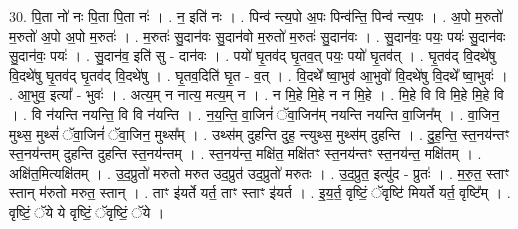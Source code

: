 \documentclass[17pt]{extarticle}
\begin{document}
30. पि॒ता नो॑ नः पि॒ता पि॒ता नः॑ । . न॒ इति॑ नः । . पिन्व॑ न्त्य॒पो अ॒पः पिन्व॑न्ति॒ पिन्व॑ न्त्य॒पः । . अ॒पो म॒रुतो॑ म॒रुतो॑ अ॒पो अ॒पो म॒रुतः॑ । . म॒रुतः॑ सु॒दान॑वः सु॒दान॑वो म॒रुतो॑ म॒रुतः॑ सु॒दान॑वः । . सु॒दान॑वः॒ पयः॒ पयः॑ सु॒दान॑वः सु॒दान॑वः॒ पयः॑ । . सु॒दान॑व॒ इति॑ सु - दान॑वः । . पयो॑ घृ॒तव॑द् घृ॒तव॒त् पयः॒ पयो॑ घृ॒तव॑त् । . घृ॒तव॑द् वि॒दथे॑षु वि॒दथे॑षु घृ॒तव॑द् घृ॒तव॑द् वि॒दथे॑षु । . घृ॒तव॒दिति॑ घृ॒त - व॒त् । . वि॒दथे᳚ ष्वा॒भुव॑ आ॒भुवो॑ वि॒दथे॑षु वि॒दथे᳚ ष्वा॒भुवः॑ । . आ॒भुव॒ इत्या᳚ - भुवः॑ । . अत्य॒म् न नात्य॒ मत्य॒म् न । . न मि॒हे मि॒हे न न मि॒हे । . मि॒हे वि वि मि॒हे मि॒हे वि । . वि न॑यन्ति नयन्ति॒ वि वि न॑यन्ति । . न॒य॒न्ति॒ वा॒जिनं॑ ॅवा॒जिन॑म् नयन्ति नयन्ति वा॒जिन᳚म् । . वा॒जिन॒ मुथ्स॒ मुथ्सं॑ ॅवा॒जिनं॑ ॅवा॒जिन॒ मुथ्स᳚म् । . उथ्स॑म् दुहन्ति दुह॒ न्त्युथ्स॒ मुथ्स॑म् दुहन्ति । . दु॒ह॒न्ति॒ स्त॒नय॑न्तꣳ स्त॒नय॑न्तम् दुहन्ति दुहन्ति स्त॒नय॑न्तम् । . स्त॒नय॑न्त॒ मक्षि॑त॒ मक्षि॑तꣳ स्त॒नय॑न्तꣳ स्त॒नय॑न्त॒ मक्षि॑तम् । . अक्षि॑त॒मित्यक्षि॑तम् । . उ॒द॒प्रुतो॑ मरुतो मरुत उद॒प्रुत॑ उद॒प्रुतो॑ मरुतः । . उ॒द॒प्रुत॒ इत्यु॑द - प्रुतः॑ । . म॒रु॒त॒ स्ताꣳ स्तान् म॑रुतो मरुत॒ स्तान् । . ताꣳ इ॑यर्ते यर्त॒ ताꣳ स्ताꣳ इ॑यर्त । . इ॒य॒र्त॒ वृष्टिं॒ ॅवृष्टि॑ मियर्ते यर्त॒ वृष्टि᳚म् । . वृष्टिं॒ ॅये ये वृष्टिं॒ ॅवृष्टिं॒ ॅये । \newline
\pagebreak
{}
\end{document}
